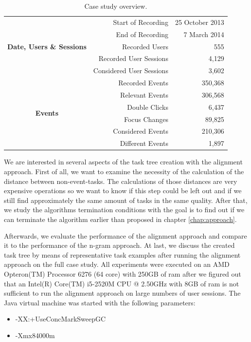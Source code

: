 \begin{table}
	\centering
	\begin{tabular}{c r r}
		\toprule
		\multirow{5}{*}{\textbf{Date, Users \& Sessions}} & Start of Recording & 25 October 2013 \\
		      & End of Recording & 7 March 2014 \\
		      & Recorded Users & 555 \\
		      & Recorded User Sessions & 4,129 \\
		      & Considered User Sessions & 3,602 \\
		\midrule
		\multirow{6}{*}{\textbf{Events}} & Recorded Events & 350,368 \\
		      & Relevant Events & 306,568 \\
		      & Double Clicks & 6,437 \\
		      & Focus Changes & 89,825 \\
			   & Considered Events & 210,306 \\
			   & Different Events & 1,897 \\
		\bottomrule
	\end{tabular}
	\caption{Case study overview.}
	\label{tab:casestudy2}
\end{table}

We are interested in several aspects of the task tree creation with the alignment approach.
First of all, we want to examine the necessity of the calculation of the distance between non-event-tasks.
The calculations of those distances are very expensive operations so we want to know if this step could be left out and if we still find approximately the same amount of tasks in the same quality.
After that, we study the algorithms termination conditions with the goal is to find out if we can terminate the algorithm earlier than proposed in chapter \ref{chap:approach}.

Afterwards, we evaluate the performance of the alignment approach and compare it to the performance of the n-gram approach.
At last, we discuss the created task tree by means of representative task examples after running the alignment approach on the full case study.
All experiments were executed on an AMD Opteron(TM) Processor 6276 (64 core) with 250GB of ram after we figured out that an Intel(R) Core(TM) i5-2520M CPU @ 2.50GHz with 8GB of ram is not sufficient to run the alignment approach on large numbers of user sessions.
The Java virtual machine was started with the following parameters:
\begin{itemize}
	\item -XX:+UseConcMarkSweepGC
	\item -Xmx84000m
\end{itemize}

